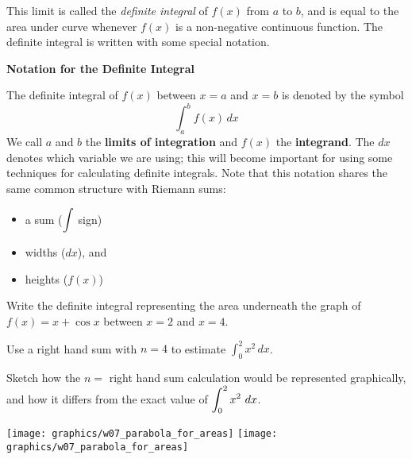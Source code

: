 This limit is called the {\em definite integral} of $f(x)$ from $a$ to $b$, and is equal to the area under curve whenever $f(x)$ is a non-negative continuous function.  The definite integral is written with some special notation.

\newpage

  {\bf{Notation for the Definite Integral}} 
  
  The definite integral of $f(x)$ between $x=a$ and
  $x=b$ is denoted by the symbol $$\int_{a}^{b} f(x) \,dx$$
  We call $a$ and $b$ the {\bf{limits of integration}} and $f(x)$ the
  {\bf{integrand}}.  The $dx$ denotes which variable we are using; this will become important for using some techniques for calculating definite integrals.
Note that this notation shares the same common structure with Riemann sums: 
\begin{itemize}
\item a sum ($\displaystyle \int $ sign) \\[1ex]
\item widths ($dx$), and \\[1ex]
\item heights ($f(x)$)
\end{itemize}

\newpage 

\problem Write the definite integral representing the area underneath
  the graph of $f(x) = x + \cos x$ between $x=2$ and $x=4$.

\vfill

\newpage

\problem 
  Use a right hand sum with $n=4$ to estimate $\displaystyle
  \int_{0}^{2}x^2\,dx$.  

\newpage

\vfill Sketch how the $n=$ right hand sum calculation would be
represented graphically, and how it differs from the exact value of
$\displaystyle \int_0^2 x^2~dx$.

\texttt{[image: graphics/w07\_parabola\_for\_areas]}
\hfill
\texttt{[image: graphics/w07\_parabola\_for\_areas]}

\newpage




